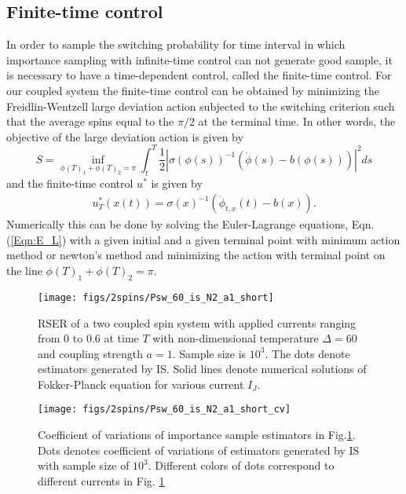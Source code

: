 \documentclass[journal,transmag]{IEEEtran}
\begin{document}
\subsection{Finite-time control}
In order to sample the switching probability for time interval in which importance sampling with infinite-time control can not generate good sample, it is necessary to have a time-dependent control, called the finite-time control. For our coupled system the finite-time control can be obtained by minimizing the Freidlin-Wentzell large deviation action subjected to the switching criterion such that the average spins equal to the $\pi/2$ at the terminal time. In other words, the objective of the large deviation action is given by
\begin{equation}
S =   \inf_{\phi(T)_1+ \phi(T)_2 =\pi} \int_t^T \frac{1}{2}| \sigma(\phi(s))^{-1}(\dot{\phi}(s) - b(\phi(s)))|^2 ds
\end{equation}
and the finite-time control $u^*$ is given by 
\begin{align} 
u^*_T(x(t)) = \sigma(x)^{-1}(\dot{\phi}_{t,x}(t) - b(x)).
\end{align}
Numerically this can be done by solving the Euler-Lagrange equations, Eqn.(\ref{Eqn:E_L}) with a given initial and a given terminal point with minimum action method or newton's method and minimizing the action with terminal point on the line $\phi(T)_1+ \phi(T)_2 =\pi$.

\begin{figure}[h]
   \centering
         \texttt{[image: figs/2spins/Psw\_60\_is\_N2\_a1\_short]}    
   \caption{RSER of a two coupled spin system with applied currents ranging from $0$ to $0.6$ at time $T$ with non-dimensional temperature $\Delta = 60$ and coupling strength $ a = 1$. Sample size is $10^3$. The dots denote estimators generated by IS. Solid lines denote numerical solutions of Fokker-Planck equation for various current $I_J$. }
   \label{figs:ISvsMC1_short}
\end{figure}

\begin{figure}[h]
   \centering
         \texttt{[image: figs/2spins/Psw\_60\_is\_N2\_a1\_short\_cv]}    
   \caption{Coefficient of variations of importance sample estimators in Fig.\ref{figs:ISvsMC1_short}. Dots denotes coefficient of variations of estimators generated by IS with sample size of $10^3$. Different colors of dots correspond to different currents in Fig. \ref{figs:ISvsMC1_short} }
   \label{figs:ISvsMC1_short_cv}
\end{figure}
\end{document}
